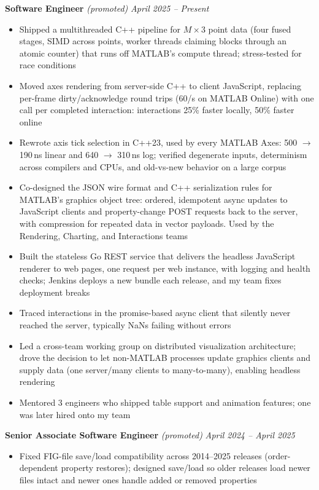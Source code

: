 \documentclass{article}
\begin{document}
{\large \textbf{Software Engineer}} \textit{(promoted)} \hfill \textit{April 2025 -- Present}
\begin{itemize}[leftmargin=*]
    \item Shipped a multithreaded C++ pipeline for $M \times 3$ point data (four fused stages, SIMD across points, worker threads claiming blocks through an atomic counter) that runs off MATLAB's compute thread; stress-tested for race conditions
    \item Moved axes rendering from server-side C++ to client JavaScript, replacing per-frame dirty/acknowledge round trips (60/s on MATLAB Online) with one call per completed interaction: interactions 25\% faster locally, 50\% faster online
    \item Rewrote axis tick selection in C++23, used by every MATLAB Axes: 500 $\to$ 190\,ns linear and 640 $\to$ 310\,ns log; verified degenerate inputs, determinism across compilers and CPUs, and old-vs-new behavior on a large corpus
    \item Co-designed the JSON wire format and C++ serialization rules for MATLAB's graphics object tree: ordered, idempotent async updates to JavaScript clients and property-change POST requests back to the server, with compression for repeated data in vector payloads. Used by the Rendering, Charting, and Interactions teams
    \item Built the stateless Go REST service that delivers the headless JavaScript renderer to web pages, one request per web instance, with logging and health checks; Jenkins deploys a new bundle each release, and my team fixes deployment breaks
    \item Traced interactions in the promise-based async client that silently never reached the server, typically NaNs failing without errors
    \item Led a cross-team working group on distributed visualization architecture; drove the decision to let non-MATLAB processes update graphics clients and supply data (one server\slash many clients to many-to-many), enabling headless rendering
    \item Mentored 3 engineers who shipped table support and animation features; one was later hired onto my team
\end{itemize}

{\large \textbf{Senior Associate Software Engineer}} \textit{(promoted)} \hfill \textit{April 2024 -- April 2025}
\begin{itemize}[leftmargin=*]
    \item Fixed FIG-file save/load compatibility across 2014--2025 releases (order-dependent property restores); designed save/load so older releases load newer files intact and newer ones handle added or removed properties
\end{itemize}
\end{document}
